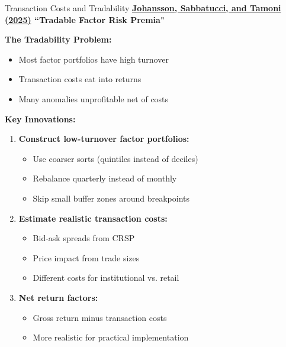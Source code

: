 \documentclass{beamer}
\begin{document}
\begin{frame}{Transaction Costs and Tradability}
    \textbf{\textcolor{blue}{\href{https://doi.org/10.1093/rof/rfae034}{Johansson, Sabbatucci, and Tamoni (2025)}} ``Tradable Factor Risk Premia"}
    
    
    \textbf{The Tradability Problem:}
    \begin{itemize}
        \item Most factor portfolios have high turnover
        \item Transaction costs eat into returns
        \item Many anomalies unprofitable net of costs
    \end{itemize}
    
    
    \textbf{Key Innovations:}
    \begin{enumerate}
        \item \textbf{Construct low-turnover factor portfolios:}
        \begin{itemize}
            \item Use coarser sorts (quintiles instead of deciles)
            \item Rebalance quarterly instead of monthly
            \item Skip small buffer zones around breakpoints
        \end{itemize}
        
        \item \textbf{Estimate realistic transaction costs:}
        \begin{itemize}
            \item Bid-ask spreads from CRSP
            \item Price impact from trade sizes
            \item Different costs for institutional vs. retail
        \end{itemize}
        
        \item \textbf{Net return factors:}
        \begin{itemize}
            \item Gross return minus transaction costs
            \item More realistic for practical implementation
        \end{itemize}
    \end{enumerate}
\end{frame}
\end{document}
